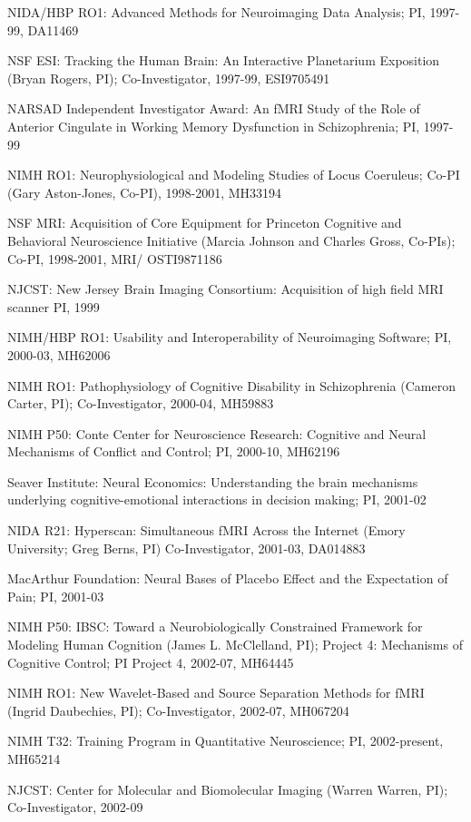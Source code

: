 \documentclass[10 pt]{article}
\begin{document}
NIDA/HBP RO1:
Advanced Methods for Neuroimaging Data Analysis;
PI,
1997-99,
DA11469

NSF ESI:
Tracking the Human Brain: An Interactive Planetarium Exposition (Bryan Rogers, PI);
Co-Investigator,
1997-99,
ESI9705491

NARSAD Independent Investigator Award:
An fMRI Study of the Role of Anterior Cingulate in Working Memory Dysfunction in Schizophrenia;
PI,
1997-99

NIMH RO1:
Neurophysiological and Modeling Studies of Locus Coeruleus;
Co-PI (Gary Aston-Jones, Co-PI),
1998-2001,
MH33194

NSF MRI:
Acquisition of Core Equipment for Princeton Cognitive and Behavioral Neuroscience Initiative (Marcia Johnson and
Charles Gross, Co-PIs);
Co-PI,
1998-2001,
MRI/ OSTI9871186

NJCST:
New Jersey Brain Imaging Consortium: Acquisition of high field MRI scanner
PI,
1999

NIMH/HBP RO1:
Usability and Interoperability of Neuroimaging Software;
PI,
2000-03,
MH62006

NIMH RO1:
Pathophysiology of Cognitive Disability in Schizophrenia (Cameron Carter, PI);
Co-Investigator,
2000-04,
MH59883

NIMH P50:
Conte Center for Neuroscience Research: Cognitive and Neural Mechanisms of Conflict and Control;
PI,
2000-10,
MH62196

Seaver Institute:
Neural Economics: Understanding the brain mechanisms underlying cognitive-emotional interactions in decision making;
PI,
2001-02

NIDA R21:
Hyperscan: Simultaneous fMRI Across the Internet (Emory University; Greg Berns, PI)
Co-Investigator,
2001-03,
DA014883

MacArthur Foundation:
Neural Bases of Placebo Effect and the Expectation of Pain;
PI,
2001-03

NIMH P50:
IBSC: Toward a Neurobiologically Constrained Framework for Modeling Human Cognition (James L. McClelland, PI);
Project 4: Mechanisms of Cognitive Control;
PI Project 4,
2002-07,
MH64445

NIMH RO1:
New Wavelet-Based and Source Separation Methods for fMRI (Ingrid Daubechies, PI);
Co-Investigator,
2002-07,
MH067204

NIMH T32:
Training Program in Quantitative Neuroscience;
PI,
2002-present,
MH65214

NJCST:
Center for Molecular and Biomolecular Imaging (Warren Warren, PI);
Co-Investigator,
2002-09
\end{document}
